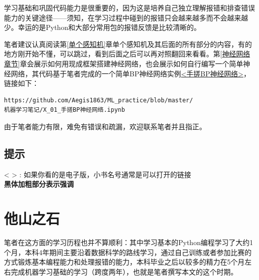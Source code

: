 \documentclass[a5paper, 11pt, openany]{book}
\begin{document}
学习基础和巩固代码能力是很重要的，因为这是培养自己独立理解报错和排查错误能力的关键途径——须知，在学习过程中碰到的报错只会越来越多而不会越来越少。幸运的是Python和大部分常用包的报错反馈是比较清晰的。

笔者建议认真阅读第\ref{单个感知机}章单个感知机及其后面的所有部分的内容，有的地方刚开始不懂，可以跳过，看到后面之后可以再对照翻回来看看。第\ref{神经网络章节}章会展示如何用现成框架搭建神经网络，也会展示如何自行编写一个简单神经网络，其代码基于笔者完成的一个简单BP神经网络实例\href{https://github.com/Aegis1863/ML_practice/blob/master/机器学习笔记/X_01_手搓BP神经网络.ipynb}{<手搓BP神经网络>}，链接\label{代码链接}如下：
\begin{verbatim}
https://github.com/Aegis1863/ML_practice/blob/master/
机器学习笔记/X_01_手搓BP神经网络.ipynb
\end{verbatim}


由于笔者能力有限，难免有错误和疏漏，欢迎联系笔者并且指正。

\section{提示}
\begin{center}
    < > : 如果你看的是电子版，小书名号通常是可以打开的链接 \\
    \textbf{黑体加粗部分表示强调}
\end{center}


\tableofcontents

\chapter{他山之石}
笔者在这方面的学习历程也并不算顺利：其中学习基本的Python编程学习了大约1个月，本科4年期间主要沿着数据科学的路线学习，通过自己训练或者参加比赛的方式锻炼基本编程能力和处理报错的能力，本科毕业之后以较多的精力在5个月左右完成机器学习基础的学习（跨度两年），也就是笔者撰写本文的这个时期。
\end{document}
